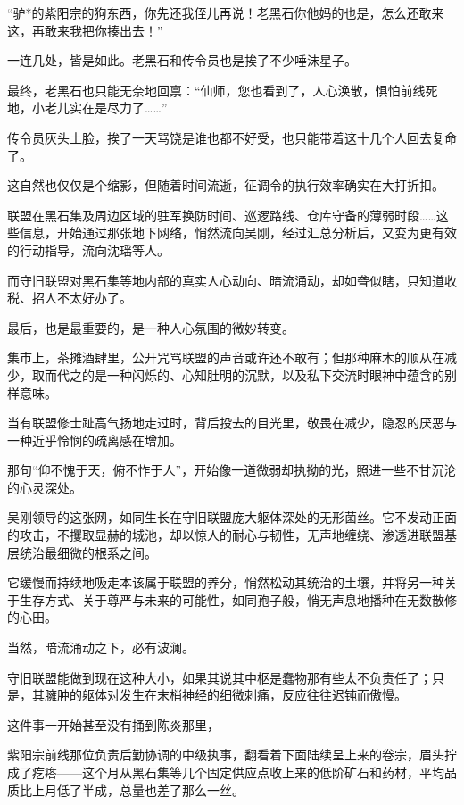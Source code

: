 “驴*的紫阳宗的狗东西，你先还我侄儿再说！老黑石你他妈的也是，怎么还敢来这，再敢来我把你揍出去！”

一连几处，皆是如此。老黑石和传令员也是挨了不少唾沫星子。

最终，老黑石也只能无奈地回禀：“仙师，您也看到了，人心涣散，惧怕前线死地，小老儿实在是尽力了……”

传令员灰头土脸，挨了一天骂饶是谁也都不好受，也只能带着这十几个人回去复命了。

这自然也仅仅是个缩影，但随着时间流逝，征调令的执行效率确实在大打折扣。

联盟在黑石集及周边区域的驻军换防时间、巡逻路线、仓库守备的薄弱时段……这些信息，开始通过那张地下网络，悄然流向吴刚，经过汇总分析后，又变为更有效的行动指导，流向沈瑶等人。

而守旧联盟对黑石集等地内部的真实人心动向、暗流涌动，却如聋似瞎，只知道收税、招人不太好办了。

\vspace{2em}

最后，也是最重要的，是一种人心氛围的微妙转变。

集市上，茶摊酒肆里，公开咒骂联盟的声音或许还不敢有；但那种麻木的顺从在减少，取而代之的是一种闪烁的、心知肚明的沉默，以及私下交流时眼神中蕴含的别样意味。

当有联盟修士趾高气扬地走过时，背后投去的目光里，敬畏在减少，隐忍的厌恶与一种近乎怜悯的疏离感在增加。

那句“仰不愧于天，俯不怍于人”，开始像一道微弱却执拗的光，照进一些不甘沉沦的心灵深处。

吴刚领导的这张网，如同生长在守旧联盟庞大躯体深处的无形菌丝。它不发动正面的攻击，不攫取显赫的城池，却以惊人的耐心与韧性，无声地缠绕、渗透进联盟基层统治最细微的根系之间。

它缓慢而持续地吸走本该属于联盟的养分，悄然松动其统治的土壤，并将另一种关于生存方式、关于尊严与未来的可能性，如同孢子般，悄无声息地播种在无数散修的心田。

\vspace{2em}

当然，暗流涌动之下，必有波澜。

守旧联盟能做到现在这种大小，如果其说其中枢是蠢物那有些太不负责任了；只是，其臃肿的躯体对发生在末梢神经的细微刺痛，反应往往迟钝而傲慢。

这件事一开始甚至没有捅到陈炎那里，

紫阳宗前线那位负责后勤协调的中级执事，翻看着下面陆续呈上来的卷宗，眉头拧成了疙瘩——这个月从黑石集等几个固定供应点收上来的低阶矿石和药材，平均品质比上月低了半成，总量也差了那么一丝。

